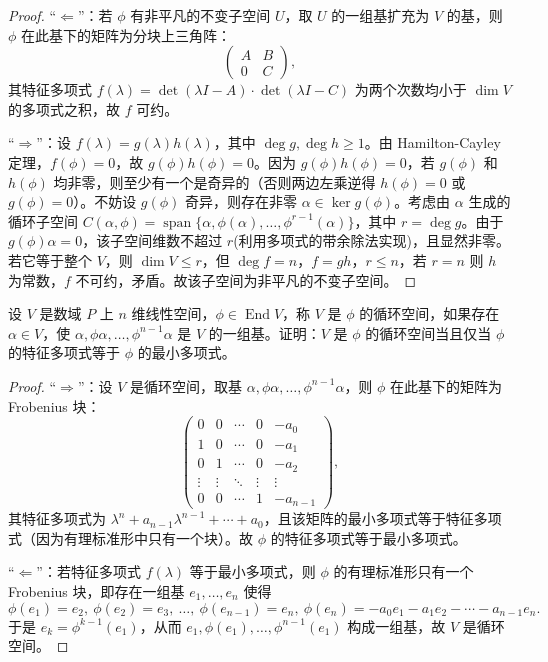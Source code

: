 \documentclass[lang=cn,12pt]{elegantbook}
\begin{document}
\begin{proof}
    “\(\Leftarrow\)”：若 \(\phi\) 有非平凡的不变子空间 \(U\)，取 \(U\) 的一组基扩充为 \(V\) 的基，则 \(\phi\) 在此基下的矩阵为分块上三角阵：
    \[
    \begin{pmatrix} A & B \\ 0 & C \end{pmatrix},
    \]
    其特征多项式 \(f(\lambda)=\det(\lambda I-A)\cdot\det(\lambda I-C)\) 为两个次数均小于 \(\dim V\) 的多项式之积，故 \(f\) 可约。
    
    “\(\Rightarrow\)”：设 \(f(\lambda)=g(\lambda)h(\lambda)\)，其中 \(\deg g,\deg h\ge 1\)。由 Hamilton-Cayley 定理，\(f(\phi)=0\)，故 \(g(\phi)h(\phi)=0\)。因为 \(g(\phi)h(\phi)=0\)，若 \(g(\phi)\) 和 \(h(\phi)\) 均非零，则至少有一个是奇异的（否则两边左乘逆得 \(h(\phi)=0\) 或 \(g(\phi)=0\)）。不妨设 \(g(\phi)\) 奇异，则存在非零 \(\alpha\in \ker g(\phi)\)。考虑由 \(\alpha\) 生成的循环子空间 \(C(\alpha,\phi)=\operatorname{span}\{\alpha,\phi(\alpha),\dots,\phi^{r-1}(\alpha)\}\)，其中 \(r=\deg g\)。由于 \(g(\phi)\alpha=0\)，该子空间维数不超过 \(r\)(利用多项式的带余除法实现)，且显然非零。若它等于整个 \(V\)，则 \(\dim V\le r\)，但 \(\deg f=n\)，\(f=gh\)，\(r\le n\)，若 \(r=n\) 则 \(h\) 为常数，\(f\) 不可约，矛盾。故该子空间为非平凡的不变子空间。
\end{proof}

\begin{example}
    设 \(V\) 是数域 \(P\) 上 \(n\) 维线性空间，\(\phi \in \operatorname{End}V\)，称 \(V\) 是 \(\phi\) 的循环空间，如果存在 \(\alpha \in V\)，使 \(\alpha, \phi\alpha, \ldots, \phi^{n-1}\alpha\) 是 \(V\) 的一组基。证明：\(V\) 是 \(\phi\) 的循环空间当且仅当 \(\phi\) 的特征多项式等于 \(\phi\) 的最小多项式。
\end{example}

\begin{proof}
    “\(\Rightarrow\)”：设 \(V\) 是循环空间，取基 \(\alpha,\phi\alpha,\dots,\phi^{n-1}\alpha\)，则 \(\phi\) 在此基下的矩阵为 Frobenius 块：
    \[
    \begin{pmatrix}
    0 & 0 & \cdots & 0 & -a_0 \\
    1 & 0 & \cdots & 0 & -a_1 \\
    0 & 1 & \cdots & 0 & -a_2 \\
    \vdots & \vdots & \ddots & \vdots & \vdots \\
    0 & 0 & \cdots & 1 & -a_{n-1}
    \end{pmatrix},
    \]
    其特征多项式为 \(\lambda^n + a_{n-1}\lambda^{n-1}+\cdots+a_0\)，且该矩阵的最小多项式等于特征多项式（因为有理标准形中只有一个块）。故 \(\phi\) 的特征多项式等于最小多项式。
    
    “\(\Leftarrow\)”：若特征多项式 \(f(\lambda)\) 等于最小多项式，则 \(\phi\) 的有理标准形只有一个 Frobenius 块，即存在一组基 \(e_1,\dots,e_n\) 使得
    \[
    \phi(e_1)=e_2,\ \phi(e_2)=e_3,\ \dots,\ \phi(e_{n-1})=e_n,\ \phi(e_n)=-a_0e_1-a_1e_2-\cdots-a_{n-1}e_n.
    \]
    于是 \(e_k = \phi^{k-1}(e_1)\)，从而 \(e_1,\phi(e_1),\dots,\phi^{n-1}(e_1)\) 构成一组基，故 \(V\) 是循环空间。
\end{proof}
\end{document}
